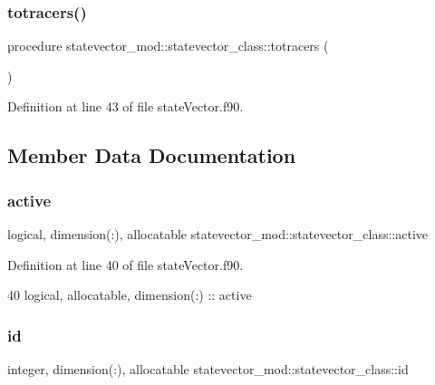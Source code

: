 \subsubsection{\texorpdfstring{totracers()}{totracers()}}
{\footnotesize\ttfamily procedure statevector\+\_\+mod\+::statevector\+\_\+class\+::totracers (\begin{DoxyParamCaption}{ }\end{DoxyParamCaption})\hspace{0.3cm}{\ttfamily [private]}}



Definition at line 43 of file state\+Vector.\+f90.



\subsection{Member Data Documentation}
\mbox{\label{structstatevector__mod_1_1statevector__class_a78ff040c3a087975ea448f9d1f7d7e1f}} 
\subsubsection{\texorpdfstring{active}{active}}
{\footnotesize\ttfamily logical, dimension(\+:), allocatable statevector\+\_\+mod\+::statevector\+\_\+class\+::active\hspace{0.3cm}{\ttfamily [private]}}



Definition at line 40 of file state\+Vector.\+f90.


\begin{DoxyCode}
40         \textcolor{keywordtype}{logical}, \textcolor{keywordtype}{allocatable}, \textcolor{keywordtype}{dimension(:)} :: active
\end{DoxyCode}
\mbox{\label{structstatevector__mod_1_1statevector__class_ae5b035e5a520de4f55c4b5ba6017f82c}} 
\subsubsection{\texorpdfstring{id}{id}}
{\footnotesize\ttfamily integer, dimension(\+:), allocatable statevector\+\_\+mod\+::statevector\+\_\+class\+::id\hspace{0.3cm}{\ttfamily [private]}}



